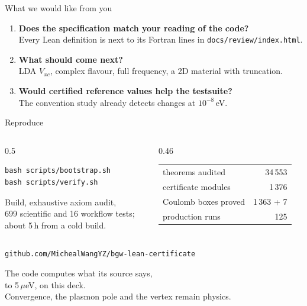 \documentclass[11pt,aspectratio=169]{beamer}
\begin{document}
\begin{frame}{What we would like from you}
\begin{enumerate}
\item \textbf{Does the specification match your reading of the code?}\\
      \small Every Lean definition is next to its Fortran lines in \texttt{docs/review/index.html}.
\item \textbf{What should come next?}\\
      \small LDA $V_{xc}$, complex flavour, full frequency, a 2D material with truncation.
\item \textbf{Would certified reference values help the testsuite?}\\
      \small The convention study already detects changes at $10^{-8}$\,eV.
\end{enumerate}
\end{frame}

\begin{frame}[fragile]{Reproduce}
\begin{columns}[c]
\begin{column}{0.5\textwidth}
\begin{lstlisting}
bash scripts/bootstrap.sh
bash scripts/verify.sh
\end{lstlisting}
\small Build, exhaustive axiom audit,\\ 699 scientific and 16 workflow tests;\\ about 5\,h from a cold build.
\end{column}
\begin{column}{0.46\textwidth}
\small
\begin{tabular}{@{}lr@{}}
\toprule
theorems audited & 34\,553 \\
certificate modules & 1\,376 \\
Coulomb boxes proved & 1\,363 + 7 \\
production runs & 125 \\
\bottomrule
\end{tabular}
\end{column}
\end{columns}
\vfill
\centering\small \texttt{github.com/MichealWangYZ/bgw-lean-certificate}
\end{frame}

\begin{frame}[standout]
The code computes what its source says,\\ to 5\,$\mu$eV, on this deck.\\[4mm]
\normalsize Convergence, the plasmon pole and the vertex remain physics.
\end{frame}
\end{document}

